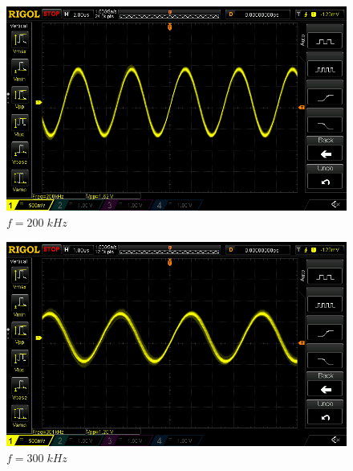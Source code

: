 \documentclass[uplatex,a4paper,11pt,oneside,openany]{jsbook}
\begin{document}
\begin{spacing}{0.67}
  \begin{multicols}{2}
    \begin{figure}[H]
       \centering
        \includegraphics[keepaspectratio, scale=0.28, angle=0]
                    {rigol/figs/FrqCharM1Y1_2kR/200khz.png}
                    \caption{$f=200\;kHz$}
                    \label{fig:frq200k}
    \end{figure}
  
    \begin{figure}[H]
       \centering
        \includegraphics[keepaspectratio, scale=0.28, angle=0]
                  {rigol/figs/FrqCharM1Y1_2kR/300khz.png}
                  \caption{$f=300\;kHz$}
                  \label{fig:frq300k}
    \end{figure}
  \end{multicols}


\end{spacing}
\end{document}
